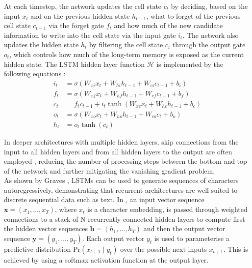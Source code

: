 \documentclass[Main.tex]{subfiles}
\begin{document}
At each timestep, the network updates the cell state $c_t$ by deciding, based on the input $x_t$ and on the previous hidden state $h_{t-1}$, what to forget of the previous cell state $c_{t-1}$ via the forget gate $f_t$ and how much of the new candidate information to write into the cell state via the input gate $i_t$. The network also updates the hidden state $h_t$ by filtering the cell state $c_t$ through the output gate $o_t$, which controls how much of the long-term memory is exposed as the current hidden state. The LSTM hidden layer function $\mathcal{H}$ is implemented by the following equations \cite{graves_generating_2013}:\\
\begin{align}
    i_t &= \sigma(W_{xi}x_t + W_{hi}h_{t-1} + W_{ci}c_{t-1} + b_i) \\
    f_t &= \sigma(W_{xf}x_t + W_{hf}h_{t-1} + W_{cf}c_{t-1} + b_f) \\
    c_t &= f_t c_{t-1} + i_t \tanh(W_{xc}x_t + W_{hc}h_{t-1} + b_c) \\
    o_t &= \sigma(W_{xo}x_t + W_{ho}h_{t-1} + W_{co}c_t + b_o) \\
    h_t &= o_t \tanh(c_t)
\end{align}

In deeper architectures with multiple hidden layers, skip connections from the input to all hidden layers and from all hidden layers to the output are often employed \cite{graves_generating_2013}, reducing the number of processing steps between the bottom and top of the network and further mitigating the vanishing gradient problem.\\

As shown by Graves \cite{graves_generating_2013}, LSTMs can be used to generate sequences of characters autoregressively, demonstrating that recurrent architectures are well suited to discrete sequential data such as text. In \cite{graves_generating_2013}, an input vector sequence $\mathbf{x} = (x_1, \ldots , x_T)$, where $x_t$ is a character embedding, is passed through weighted connections to a stack of N recurrently connected hidden layers to compute first the hidden vector sequences $\mathbf{h} = (h_1, \ldots , h_T )$ and then the output vector sequence $\mathbf{y} = (y_1, \ldots , y_T )$. Each output vector $y_t$ is used to parameterise a predictive distribution $\text{Pr}(x_{t+1}\mid y_t)$ over the possible next inputs $x_{t+1}$. This is achieved by using a softmax activation function at the output layer.\\
\end{document}
